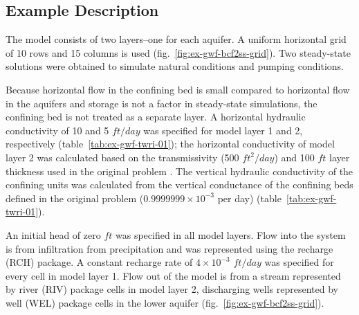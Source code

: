 \subsection{Example Description}
The model consists of two layers--one for each aquifer. A uniform horizontal grid of 10 rows and 15 columns is used (fig.~\ref{fig:ex-gwf-bcf2ss-grid}). Two steady-state solutions were obtained to simulate natural conditions and pumping conditions. 

Because horizontal flow in the confining bed is small compared to horizontal flow in the aquifers and storage is not a factor in steady-state simulations, the confining bed is not treated as a separate layer. A horizontal hydraulic conductivity of 10 and 5 $ft/day$ was specified for model layer 1 and 2, respectively (table~\ref{tab:ex-gwf-twri-01}); the horizontal conductivity of model layer 2 was calculated based on the transmissivity (500 $ft^2/day$) and 100 $ft$ layer thickness used in the original problem \citep{mcdonaldetal1991wetdry}. The vertical hydraulic conductivity of the confining units was calculated from the vertical conductance of the confining beds defined in the original problem ($0.9999999 \times 10^{-3}$ per day)  (table~\ref{tab:ex-gwf-twri-01}).



An initial head of zero $ft$ was specified in all model layers. Flow into the system is from infiltration from precipitation and was represented using the recharge (RCH) package. A constant recharge rate of $4 \times 10^{-3}$ $ft/day$ was specified for every cell in model layer 1. Flow out of the model is from a stream represented by river (RIV) package cells in model layer 2, discharging wells represented by well (WEL) package cells in the lower aquifer (fig.~\ref{fig:ex-gwf-bcf2ss-grid}).


